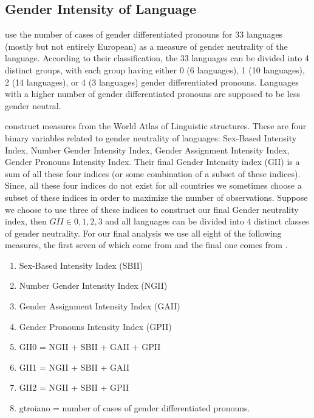 \documentclass[11pt]{article}
\begin{document}
\begin{spacing}{1.4}
\subsection{Gender Intensity of Language}
\citet{givati2012law} use the number of cases of gender differentiated pronouns 
for 33 languages (mostly but not entirely European) as a measure of gender 
neutrality of the language. According to their classification, the 33 languages 
can be divided into 4 distinct groups, with each group having either 0 (6 
languages), 1 (10 languages), 2 (14 languages), or 4 (3 languages) gender 
differentiated pronouns. Languages with a higher number of gender differentiated 
pronouns are supposed to be less gender neutral.

\cite{gay2013} construct measures from the World Atlas of Linguistic structures.
These are four binary variables related to gender neutrality of languages: 
Sex-Based Intensity Index, Number Gender Intensity Index, Gender Assignment 
Intensity Index, Gender Pronouns Intensity Index. Their final Gender Intensity 
index (GII) is a sum of all these four indices (or some combination of a subset 
of these indices). Since, all these four indices do not exist for all countries 
we sometimes choose a subset of these indices in order to maximize the number of 
observations. Suppose we choose to use three of these indices to construct our 
final Gender neutrality index, then $GII \in {0, 1, 2, 3}$ and all languages 
can be divided into 4 distinct classes of gender neutrality. For our final 
analysis we  use all eight of the following measures, the first seven of which 
come from \cite{gay2013} and the final one comes from \citet{givati2012law}.


\begin{enumerate}
\item Sex-Based Intensity Index (SBII) 
\item Number Gender Intensity Index (NGII)
\item Gender Assignment Intensity Index (GAII) 
\item Gender Pronouns Intensity Index (GPII) 
\item GII0 = NGII + SBII + GAII + GPII
\item GII1 = NGII + SBII + GAII
\item GII2 = NGII + SBII + GPII
\item gtroiano = number of cases of gender differentiated pronouns.
\end{enumerate}



\end{spacing}
\end{document}
